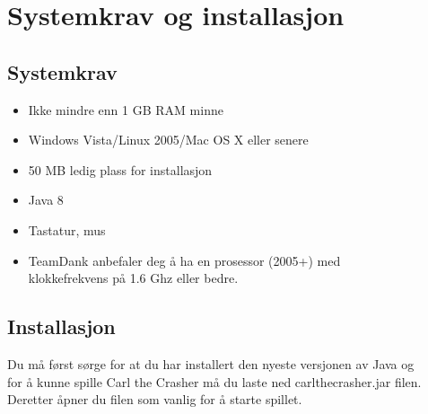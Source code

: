\documentclass[paper=a4]{article}
\begin{document}
\section{Systemkrav og installasjon}
\subsection{Systemkrav}
\begin{itemize}
	\item Ikke mindre enn 1 GB RAM minne\\
	\item Windows Vista/Linux 2005/Mac OS X eller senere \\
	\item 50 MB ledig plass for installasjon \\
	\item Java 8 \\
	\item Tastatur, mus \\
 	\item TeamDank anbefaler deg å ha en prosessor (2005+) med \\ 
klokkefrekvens på 1.6 Ghz eller bedre.
\end{itemize}
\subsection{Installasjon}
Du må først sørge for at du har installert den nyeste versjonen av Java og \\
for å kunne spille Carl the Crasher må du laste ned carlthecrasher.jar filen. \\
Deretter åpner du filen som vanlig for å starte spillet.   
\newpage
\end{document}

